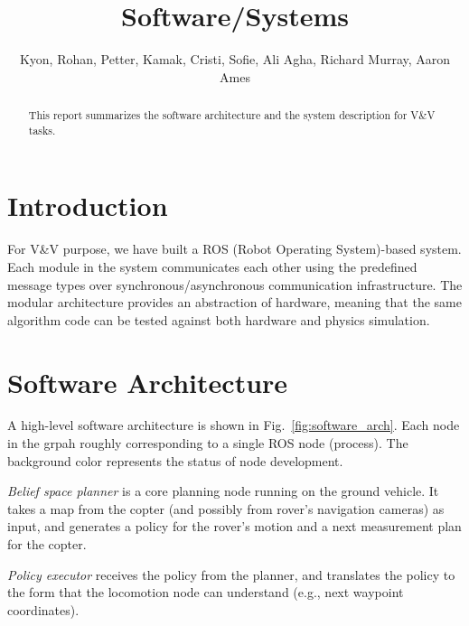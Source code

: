 \documentclass[conference]{IEEEtran}
\begin{document}

\title{\huge Software/Systems}

\author{Kyon, Rohan, Petter, Kamak, Cristi, Sofie, Ali Agha, Richard Murray, Aaron Ames}

\maketitle

\begin{abstract}
This report summarizes the software architecture and the system description for V\&V tasks. 
\end{abstract}

\IEEEpeerreviewmaketitle

	
\section{Introduction} \label{subsec:intro}

For V\&V purpose, we have built a ROS (Robot Operating System)-based system. Each module in the system communicates each other using the predefined message types over synchronous/asynchronous communication infrastructure. The modular architecture provides an abstraction of hardware, meaning that the same algorithm code can be tested against both hardware and physics simulation. 

\section{Software Architecture}

A high-level software architecture is shown in Fig.~\ref{fig:software_arch}. Each node in the grpah roughly corresponding to a single ROS node (process). The background color represents the status of node development. 

\textit{Belief space planner} is a core planning node running on the ground vehicle. It takes a map from the copter (and possibly from rover's navigation cameras) as input, and generates a policy for the rover's motion and a next measurement plan for the copter. 

\textit{Policy executor} receives the policy from the planner, and translates the policy to the form that the locomotion node can understand (e.g., next waypoint coordinates).
\end{document}
